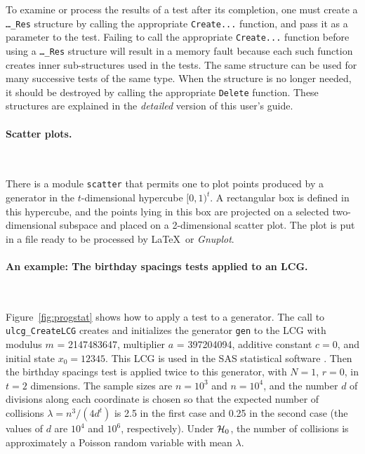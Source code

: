 \ifdetailed %

To examine or process the results of a test after its completion,
one must create a
{\tt \ldots\_Res} structure by calling the appropriate {\tt Create...}
function, and pass it as a parameter to the test. Failing to call the
appropriate {\tt Create...} function before using a {\tt \ldots\_Res}
structure will result in a memory fault because each such
function creates inner sub-structures used in the tests.
The same structure can be used for many successive tests of the same type.
When the structure is no longer needed, it should be destroyed by
calling the appropriate {\tt Delete} function.
These structures are explained in the {\em detailed\/}
version of this user's guide.

\fi  %

\paragraph*{Scatter plots.} \

There is a  module {\tt scatter} that permits one to plot points produced
by a  generator in the $t$-dimensional hypercube $[0,1)^t$.
A rectangular box is defined in this hypercube, and the points lying
in this box are projected on a selected two-dimensional subspace
and placed on a 2-dimensional scatter plot.
The plot is put in a file ready to be processed by
\LaTeX\ or {\it Gnuplot}.



\paragraph*{An example: The birthday spacings tests applied to an LCG.} \

Figure~\ref{fig:progstat} shows how to apply a test to a generator.
The call to {\tt ulcg\_CreateLCG} creates and initializes the generator
{\tt gen} to the LCG with modulus $m$ = 2147483647,
multiplier $a$ = 397204094, additive constant $c=0$, and initial
state $x_0 = 12345$.  This LCG is used in the SAS statistical
 software \cite{iSAS90a}.
Then the birthday spacings test is applied twice to this generator,
with $N=1$, $r=0$, in $t=2$ dimensions.
The sample sizes are $n=10^3$ and $n=10^4$, and the number $d$ of
divisions along each coordinate is chosen so that the expected number
of collisions $\lambda = n^3/(4d^t)$ is 2.5 in the first case and 0.25
in the second case (the values of $d$ are $10^4$ and $10^6$, respectively).
Under $\mathcal{H}_0$, the number of collisions is approximately a Poisson
random variable with mean $\lambda$.


